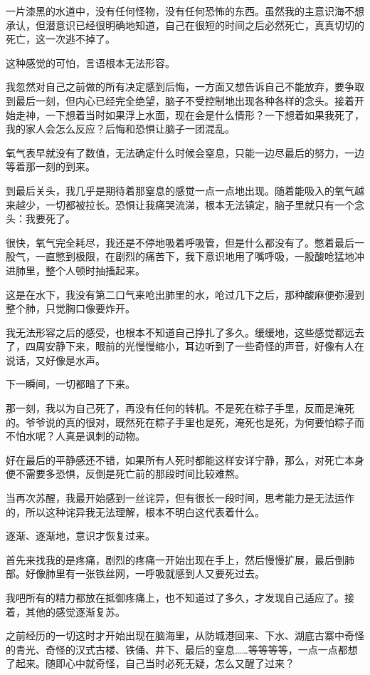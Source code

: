 一片漆黑的水道中，没有任何怪物，没有任何恐怖的东西。虽然我的主意识海不想承认，但潜意识已经很明确地知道，自己在很短的时间之后必然死亡，真真切切的死亡，这一次逃不掉了。

这种感觉的可怕，言语根本无法形容。

我忽然对自己之前做的所有决定感到后悔，一方面又想告诉自己不能放弃，要争取到最后一刻，但内心已经完全绝望，脑子不受控制地出现各种各样的念头。接着开始走神，一下想着当时如果浮上水面，现在会是什么情形？一下想着如果我死了，我的家人会怎么反应？后悔和恐惧让脑子一团混乱。

氧气表早就没有了数值，无法确定什么时候会窒息，只能一边尽最后的努力，一边等着那一刻的到来。

到最后关头，我几乎是期待着那窒息的感觉一点一点地出现。随着能吸入的氧气越来越少，一切都被拉长。恐惧让我痛哭流涕，根本无法镇定，脑子里就只有一个念头：我要死了。

很快，氧气完全耗尽，我还是不停地吸着呼吸管，但是什么都没有了。憋着最后一股气，一直憋到极限，在剧烈的痛苦下，我下意识地用了嘴呼吸，一股酸呛猛地冲进肺里，整个人顿时抽搐起来。

这是在水下，我没有第二口气来呛出肺里的水，呛过几下之后，那种酸麻便弥漫到整个肺，只觉胸口像要炸开。

我无法形容之后的感受，也根本不知道自己挣扎了多久。缓缓地，这些感觉都远去了，四周安静下来，眼前的光慢慢缩小，耳边听到了一些奇怪的声音，好像有人在说话，又好像是水声。

下一瞬间，一切都暗了下来。

那一刻，我以为自己死了，再没有任何的转机。不是死在粽子手里，反而是淹死的。爷爷说的真的很对，既然死在粽子手里也是死，淹死也是死，为何要怕粽子而不怕水呢？人真是讽刺的动物。

好在最后的平静感还不错，如果所有人死时都能这样安详宁静，那么，对死亡本身便不需要多恐惧，反倒是死亡前的那段时间比较难熬。

当再次苏醒，我最开始感到一丝诧异，但有很长一段时间，思考能力是无法运作的，所以这种诧异我无法理解，根本不明白这代表着什么。

逐渐、逐渐地，意识才恢复过来。

首先来找我的是疼痛，剧烈的疼痛一开始出现在手上，然后慢慢扩展，最后倒肺部。好像肺里有一张铁丝网，一呼吸就感到人又要死过去。

我吧所有的精力都放在抵御疼痛上，也不知道过了多久，才发现自己适应了。接着，其他的感觉逐渐复苏。

之前经历的一切这时才开始出现在脑海里，从防城港回来、下水、湖底古寨中奇怪的青光、奇怪的汉式古楼、铁俑、井下、最后的窒息……等等等等，一点一点都想了起来。随即心中就奇怪，自己当时必死无疑，怎么又醒了过来？

